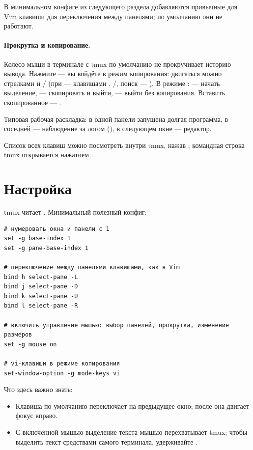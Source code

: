В минимальном конфиге из следующего раздела добавляются
привычные для Vim клавиши  для переключения
между панелями; по умолчанию они не работают.

\paragraph{Прокрутка и копирование.}

Колесо мыши в терминале с tmux по умолчанию не прокручивает
историю вывода. Нажмите \cmd{Ctrl+b [} --- вы войдёте в режим
копирования: двигаться можно стрелками и /
(при  --- клавишами ,
/, поиск --- \cmd{/}). В режиме
:  --- начать выделение,  ---
скопировать и выйти,  --- выйти без копирования.
Вставить скопированное --- \cmd{Ctrl+b ]}.

Типовая рабочая раскладка: в одной панели запущена долгая
программа, в соседней --- наблюдение за логом (),
в следующем окне --- редактор.

Список всех клавиш можно посмотреть внутри tmux, нажав
; командная строка tmux открывается нажатием
.

\section{Настройка}

tmux читает . Минимальный
полезный конфиг:
\begin{verbatim}
# нумеровать окна и панели с 1
set -g base-index 1
set -g pane-base-index 1

# переключение между панелями клавишами, как в Vim
bind h select-pane -L
bind j select-pane -D
bind k select-pane -U
bind l select-pane -R

# включить управление мышью: выбор панелей, прокрутка, изменение размеров
set -g mouse on

# vi-клавиши в режиме копирования
set-window-option -g mode-keys vi
\end{verbatim}

Что здесь важно знать:
\begin{itemize}
  \item Клавиша  по умолчанию переключает на предыдущее
    окно; после  она двигает фокус вправо.
  \item С включённой мышью выделение текста мышью перехватывает
    tmux; чтобы выделить текст средствами самого терминала,
    удерживайте .
\end{itemize}

